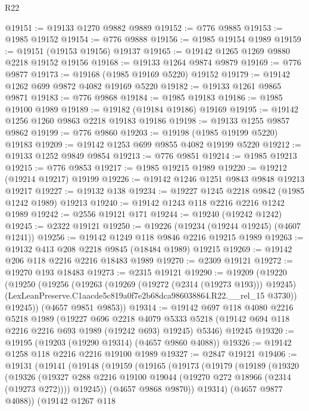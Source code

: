 \begin{lexlean}{R22}
\begin{coremodule}
@19151 := @19133 @1270 @9882 @9889
@19152 := @776 @9885
@19153 := @1985 @19152
@19154 := @776 @9888
@19156 := @1985 @19154 @1989
@19159 := @19151 (@19153 @19156) @19137
@19165 := @19142 @1265 @1269 @9880 @2218 @19152 @19156
@19168 := @19133 @1264 @9874 @9879
@19169 := @776 @9877
@19173 := @19168 (@1985 @19169 @5220) @19152
@19179 := @19142 @1262 @699 @9872 @4082 @19169 @5220
@19182 := @19133 @1261 @9865 @9871
@19183 := @776 @9868
@19184 := @1985 @19183
@19186 := @1985 @19100 @1989
@19189 := @19182 (@19184 @19186) @19169
@19195 := @19142 @1256 @1260 @9863 @2218 @19183 @19186
@19198 := @19133 @1255 @9857 @9862
@19199 := @776 @9860
@19203 := @19198 (@1985 @19199 @5220) @19183
@19209 := @19142 @1253 @699 @9855 @4082 @19199 @5220
@19212 := @19133 @1252 @9849 @9854
@19213 := @776 @9851
@19214 := @1985 @19213
@19215 := @776 @9853
@19217 := @1985 @19215 @1989
@19220 := @19212 (@19214 @19217) @19199
@19226 := @19142 @1246 @1251 @9843 @9848 @19213 @19217
@19227 := @19132 @138
@19234 := @19227 @1245 @2218 @9842 (@1985 @1242 @1989) @19213
@19240 := @19142 @1243 @118 @2216 @2216 @1242 @1989
@19242 := @2556 @19121 @171
@19244 := @19240 (@19242 @1242)
@19245 := @2322 @19121
@19250 := @19226 (@19234 (@19244 @19245) (@4607 @1241))
@19256 := @19142 @1249 @118 @9846 @2216 @19215 @1989
@19263 := @19132 @413 @208 @2218 @9845 (@18484 @1989) @19215
@19269 := @19142 @206 @118 @2216 @2216 @18483 @1989
@19270 := @2309 @19121
@19272 := @19270 @193 @18483
@19273 := @2315 @19121
@19290 := @19209
    (@19220
      (@19250
        (@19256
          (@19263
            (@19269 (@19272 (@2314 (@19273 @193))) @19245)
            (LexLeanPreserve.C1aacde5c819a0f7e2b68dca986038864.R22.__rel_15 @3730))
          @19245))
      (@4657 @9851 @9853))
@19314 := @19142
    @697
    @118
    @4080
    @2216
    @5218
    @1989
    (@19227
      @696
      @2218
      @4079
      @5333
      @5218
      (@19142 @694 @118 @2216 @2216 @693 @1989 (@19242 @693) @19245)
      @5346)
    @19245
@19320 := @19195 (@19203 (@19290 @19314) (@4657 @9860 @4088))
@19326 := @19142 @1258 @118 @2216 @2216 @19100 @1989
@19327 := @2847 @19121
@19406 := @19131
    (@19141
      (@19148
        (@19159
          (@19165
            (@19173
              (@19179
                (@19189
                  (@19320
                    (@19326
                      (@19327 @288 @2216 @19100 @19044 (@19270 @272 @18966 (@2314 (@19273 @272))))
                      @19245))
                  (@4657 @9868 @9870))
                @19314)
              (@4657 @9877 @4088))
            (@19142
              @1267
              @118

\end{coremodule}
\end{lexlean}
